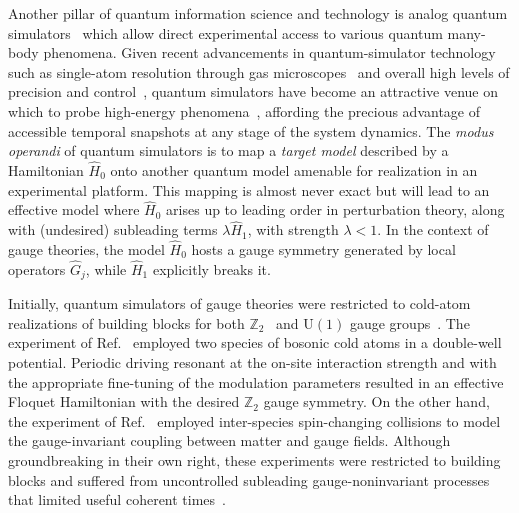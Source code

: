  Another pillar of quantum information science and technology is analog quantum simulators~\cite{Hauke2013,Georgescu2014,Acin2018} which allow direct experimental access to various quantum many-body phenomena. Given recent advancements in quantum-simulator technology such as single-atom resolution through gas microscopes~\cite{Bakr2009,Bakr2010,Gross2021} and overall high levels of precision and control~\cite{Bloch2008}, quantum simulators have become an attractive venue on which to probe high-energy phenomena~\cite{Pasquans_review,Dalmonte2016,Zohar2015a,aidelsburger2021cold,zohar2021quantum}, affording the precious advantage of accessible temporal snapshots at any stage of the system dynamics. The \textit{modus operandi} of quantum simulators is to map a \textit{target model} described by a Hamiltonian $\hat{H}_0$ onto another quantum model amenable for realization in an experimental platform. This mapping is almost never exact but will lead to an effective model where $\hat{H}_0$ arises up to leading order in perturbation theory, along with (undesired) subleading terms $\lambda\hat{H}_1$, with strength $\lambda<1$. In the context of gauge theories, the model $\hat{H}_0$ hosts a gauge symmetry generated by local operators $\hat{G}_j$, while $\hat{H}_1$ explicitly breaks it.

Initially, quantum simulators of gauge theories were restricted to cold-atom realizations of building blocks for both $\mathbb{Z}_2$~\cite{Schweizer2019} and $\mathrm{U}(1)$ gauge groups~\cite{Mil2020}. The experiment of Ref.~\cite{Schweizer2019} employed two species of bosonic cold atoms in a double-well potential. Periodic driving resonant at the on-site interaction strength and with the appropriate fine-tuning of the modulation parameters resulted in an effective Floquet Hamiltonian with the desired $\mathbb{Z}_2$ gauge symmetry. On the other hand, the experiment of Ref.~\cite{Mil2020} employed inter-species spin-changing collisions to model the gauge-invariant coupling between matter and gauge fields. Although groundbreaking in their own right, these experiments were restricted to building blocks and suffered from uncontrolled subleading gauge-noninvariant processes that limited useful coherent times~\cite{Halimeh2020}.

